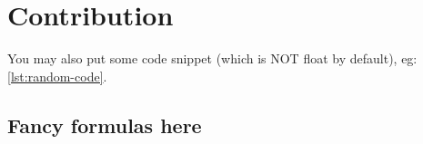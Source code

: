 
\chapter{Contribution}
\label{chap:contribution}

You may also put some code snippet (which is NOT float by default), eg: \cref{lst:random-code}.



\section{Fancy formulas here}

